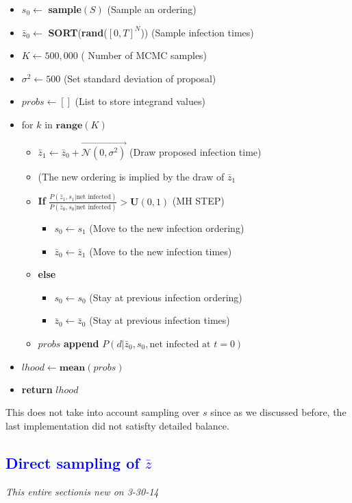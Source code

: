 \documentclass{article}
\begin{document}
\begin{itemize}
\item $s_0 \leftarrow $ \textbf{sample}$(S)$ (Sample an ordering)
\item $\bar{z}_0 \leftarrow$ \textbf{SORT}(\textbf{rand}($[0, T]^N$)) (Sample infection times)
\item $K \leftarrow 500,000$ ( Number of MCMC samples)
\item $\sigma^2 \leftarrow 500$ (Set standard deviation of proposal)
\item $probs \leftarrow []$ (List to store integrand values)
\item for $k$ in $\textbf{range}(K)$
\begin{itemize}
\item $\bar{z}_1 \leftarrow  \bar{z}_0 + \overrightarrow{\mathcal{N}(0, \sigma^2)}$ (Draw proposed infection time)
\item (The new ordering is implied by the draw of $\bar{z}_1$
\item \textbf{If} $\frac{P(\bar{z}_1, s_1 | \text{net infected})}{P(\bar{z}_0, s_0 | \text{net infected})} > \mathbf{U}(0,1)$ (MH STEP)
\begin{itemize}
\item $s_0 \leftarrow s_1$ (Move to the new infection ordering)
\item $\bar{z}_0  \leftarrow \bar{z}_1$ (Move to the new infection times)
\end{itemize}
\item \textbf{else}
\begin{itemize}
\item $s_0 \leftarrow s_0$ (Stay at previous infection ordering)
\item $\bar{z}_0 \leftarrow \bar{z}_0$     (Stay at previous infection times)
\end{itemize}
\item $probs$ \textbf{append} $P(d | \bar{z}_0, s_0,  \text{net infected at } t=0)$
\end{itemize}
\item $lhood \leftarrow \textbf{mean}(probs)$
\item \textbf{return }$lhood$
\end{itemize}

This does not take into account sampling over $s$ since as we discussed before, the last implementation did not satisfty detailed balance.

\pagebreak

\subsection{ \textcolor{blue}{Direct sampling of $\bar{z}$}}
\emph{This entire sectionis new on 3-30-14}
\end{document}
